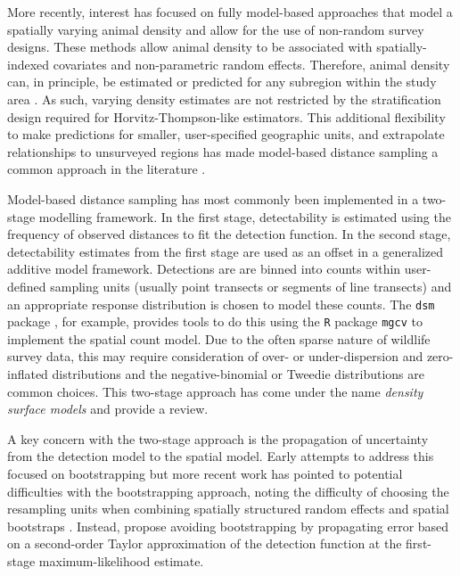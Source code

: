 \documentclass{statsoc}
\begin{document}
More recently, interest has focused on fully model-based approaches that model a spatially varying animal density and allow for the use of non-random survey designs.  These methods allow animal density to be associated with spatially-indexed covariates and non-parametric random effects.  Therefore, animal density can, in principle, be estimated or predicted for any subregion within the study area \citep{buckland_model-based_2016, miller_spatial_2013, johnson_model-based_2010}.  As such, varying density estimates are not restricted by the stratification design required for Horvitz-Thompson-like estimators.  This additional flexibility to make predictions for smaller, user-specified geographic units, and extrapolate relationships to unsurveyed regions has made model-based distance sampling a common approach in the literature \citep{garciabaron_modelling_2019, herr_aerial_2019, breen_new_2017, williams_chilean_2011, stokes_monitoring_2010, williams_modeling_2006}.

Model-based distance sampling has most commonly been implemented in a two-stage modelling framework.  In the first stage, detectability is estimated using the frequency of observed distances to fit the detection function.  In the second stage, detectability estimates from the first stage are used as an offset in a generalized additive model framework.  Detections are are binned into counts within user-defined sampling units (usually point transects or segments of line transects) and an appropriate response distribution is chosen to model these counts.  The \texttt{dsm} package \citep{miller_spatial_2013}, for example, provides tools to do this using the \texttt{R} package \texttt{mgcv} \citep{wood_gam_2017} to implement the spatial count model.   Due to the often sparse nature of wildlife survey data, this may require consideration of over- or under-dispersion and zero-inflated distributions and the negative-binomial or Tweedie distributions are common choices.  This two-stage approach has come under the name \textit{density surface models} and \cite{miller_spatial_2013} provide a review.

A key concern with the two-stage approach is the propagation of uncertainty from the detection model to the spatial model.  Early attempts to address this focused on bootstrapping \citep{hedley_spatial_2004, lahiri_resampling_2003} but more recent work has pointed to potential difficulties with the bootstrapping approach, noting the difficulty of choosing the resampling units when combining spatially structured random effects and spatial bootstraps \citep{bravington_VariancePropagationDensity_2021, williams_chilean_2011}. Instead, \cite{bravington_VariancePropagationDensity_2021} propose avoiding bootstrapping by propagating error based on a second-order Taylor approximation of the detection function at the first-stage maximum-likelihood estimate.
\end{document}
